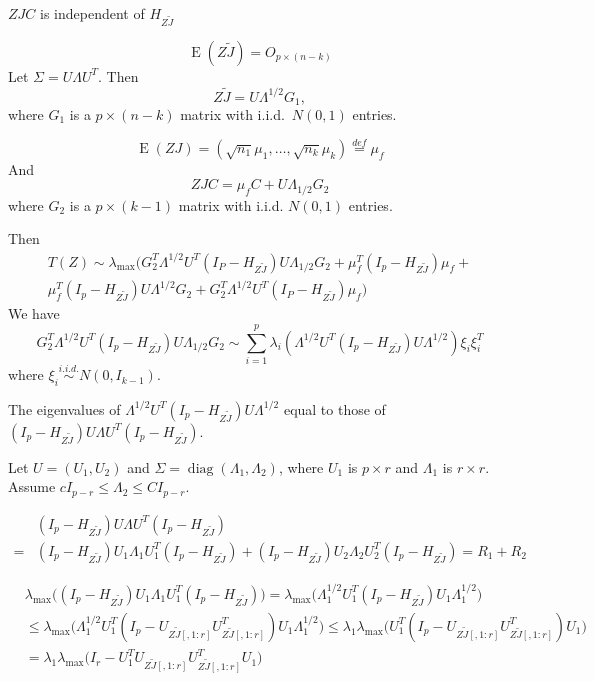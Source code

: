 \documentclass[review]{elsarticle}
\DeclareMathOperator{\mydiag}{diag}
\DeclareMathOperator{\myE}{E}
\theoremstyle{plain}
\theoremstyle{definition}
\theoremstyle{remark}
\begin{document}
$ZJC$ is independent of $H_{Z\tilde{J}}$

$$
\myE (Z\tilde{J}) = O_{p\times (n-k)}
$$
Let $\Sigma = U\Lambda U^T$. Then
$$
Z\tilde{J} = U\Lambda^{1/2} G_1,
$$
where $G_1$ is a $p\times (n-k)$ matrix with i.i.d.\ $N(0,1)$ entries.


$$
\myE (ZJ) =(\sqrt{n_1}\mu_1,\ldots,\sqrt{n_k}\mu_k)\overset{def}{=}\mu_{f}
$$
And
$$
ZJC = \mu_f C + U\Lambda_{1/2} G_2
$$
where $G_2$ is a $p\times (k-1)$ matrix with i.i.d. $N(0,1)$ entries.

Then 
$$
\begin{aligned}
T(Z)\sim \lambda_{\max}(
    G_2^T \Lambda^{1/2}U^T (I_P-H_{Z\tilde{J}})U\Lambda_{1/2}G_2+
\mu_f^T (I_p -H_{Z\tilde{J}})\mu_f+\\
    \mu_f^T (I_p -H_{Z\tilde{J}})U\Lambda^{1/2}G_2+
G_2^T \Lambda^{1/2}U^T (I_P-H_{Z\tilde{J}})\mu_f)
\end{aligned}
$$
We have
$$
    G_2^T \Lambda^{1/2}U^T (I_p-H_{Z\tilde{J}})U\Lambda_{1/2}G_2\sim
    \sum_{i=1}^p \lambda_i (\Lambda^{1/2}U^T (I_p-H_{Z\tilde{J}})U\Lambda^{1/2})\xi_i \xi_i^T
$$
where $\xi_i\overset{i.i.d.}{\sim} N(0,I_{k-1})$.





The eigenvalues of $\Lambda^{1/2}U^T (I_p-H_{Z\tilde{J}})U\Lambda^{1/2}$ equal to those of $(I_p-H_{Z\tilde{J}})U\Lambda U^T (I_p-H_{Z\tilde{J}})$.

Let $U=(U_1, U_2)$ and $\Sigma=\mydiag(\Lambda_1,\Lambda_2)$, where $U_1$ is $p\times r$ and $\Lambda_1$ is $r\times r$. Assume $c I_{p-r}\leq \Lambda_2\leq C I_{p-r}$.

$$
\begin{aligned}
    &(I_p-H_{Z\tilde{J}})U\Lambda U^T (I_p-H_{Z\tilde{J}})
    \\
    =&
    (I_p-H_{Z\tilde{J}})U_1\Lambda_1 U_1^T(I_p-H_{Z\tilde{J}})+(I_p-H_{Z\tilde{J}})U_2\Lambda_2 U_2^T (I_p-H_{Z\tilde{J}})
    =R_1+R_2
\end{aligned}
$$


$$
\begin{aligned}
    &\lambda_{\max}\big((I_p-H_{Z\tilde{J}})U_1\Lambda_1 U_1^T(I_p-H_{Z\tilde{J}})\big)
    =
    \lambda_{\max}\big(\Lambda_1^{1/2} U_1^T(I_p-H_{Z\tilde{J}}) U_1 \Lambda_1^{1/2}\big)\\
    &\leq 
    \lambda_{\max}\big(\Lambda_1^{1/2} U_1^T(I_p-U_{Z\tilde{J}[,1:r]}U_{Z\tilde{J}[,1:r]}^T) U_1 \Lambda_1^{1/2}\big)
    \leq 
    \lambda_1
    \lambda_{\max}\big(U_1^T(I_p-U_{Z\tilde{J}[,1:r]}U_{Z\tilde{J}[,1:r]}^T) U_1 \big)\\
    &= 
    \lambda_1
    \lambda_{\max}\big(I_r - U_1^TU_{Z\tilde{J}[,1:r]}U_{Z\tilde{J}[,1:r]}^T U_1 \big)\\
\end{aligned}
$$
\end{document}
